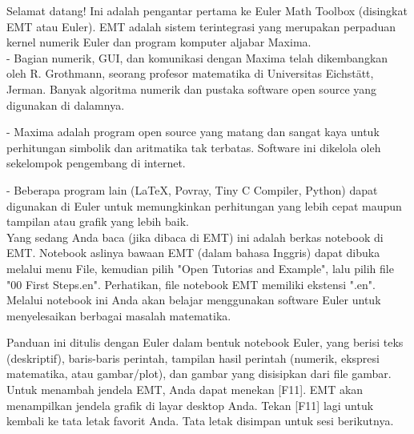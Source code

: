 \begin{eulernotebook}

    \begin{eulercomment}
        Selamat datang! Ini adalah pengantar pertama ke Euler Math Toolbox (disingkat EMT atau Euler). EMT adalah sistem terintegrasi yang merupakan perpaduan kernel numerik Euler dan program komputer aljabar Maxima.\\
        
        - Bagian numerik, GUI, dan komunikasi dengan Maxima telah dikembangkan oleh R. Grothmann, seorang profesor matematika di Universitas
        Eichstätt, Jerman. Banyak algoritma numerik dan pustaka software open
        source yang digunakan di dalamnya.
        
        - Maxima adalah program open source yang matang dan sangat kaya untuk
        perhitungan simbolik dan aritmatika tak terbatas. Software ini
        dikelola oleh sekelompok pengembang di internet.
        
        - Beberapa program lain (LaTeX, Povray, Tiny C Compiler, Python) dapat
        digunakan di Euler untuk memungkinkan perhitungan yang lebih cepat
        maupun tampilan atau grafik yang lebih baik.\\
        
        Yang sedang Anda baca (jika dibaca di EMT) ini adalah berkas notebook
        di EMT. Notebook aslinya bawaan EMT (dalam bahasa Inggris) dapat
        dibuka melalui menu File, kemudian pilih "Open Tutorias and Example",
        lalu pilih file "00 First Steps.en". Perhatikan, file notebook EMT
        memiliki ekstensi ".en". Melalui notebook ini Anda akan belajar
        menggunakan software Euler untuk menyelesaikan berbagai masalah
        matematika.\\
    \end{eulercomment}

    \begin{eulercomment}
        Panduan ini ditulis dengan Euler dalam bentuk notebook Euler, yang berisi teks (deskriptif), baris-baris perintah, tampilan hasil
        perintah (numerik, ekspresi matematika, atau gambar/plot), dan gambar
        yang disisipkan dari file gambar.\\
        
        Untuk menambah jendela EMT, Anda dapat menekan [F11]. EMT akan
        menampilkan jendela grafik di layar desktop Anda. Tekan [F11] lagi
        untuk kembali ke tata letak favorit Anda. Tata letak disimpan untuk
        sesi berikutnya.\\
        

\end{eulercomment}
\end{eulernotebook}
